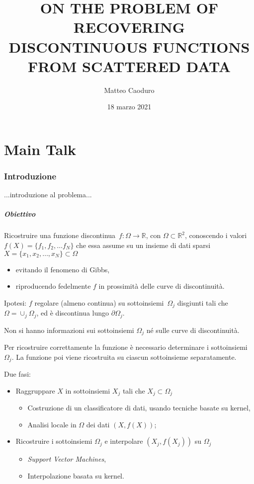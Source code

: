 \documentclass[10pt]{beamer}
\title{ON THE PROBLEM OF RECOVERING\\
	  DISCONTINUOUS FUNCTIONS\\
	  FROM SCATTERED DATA}
\author{Matteo Caoduro}
\date{18 marzo 2021}
\institute{\normalsize \emph{Relatore:} Prof.ssa\, Milvia Francesca Rossini}
\theoremstyle{definition}
\theoremstyle{plain}
\def\R{\mathbb R}
\begin{document}
\begin{frame}
  \titlepage
\end{frame}



\part<presentation>{Main Talk}

\section{Introduzione}


\begin{frame}
...introduzione al problema...
\end{frame}


\begin{frame}
\frametitle{Obiettivo}
Ricostruire  una \alert{funzione discontinua}~$f:\Omega\to\R$, con $\Omega\subset\R^2$, conoscendo i valori $f(X) = \{f_1,f_2,\dots f_N\}$ che essa assume su un insieme di \alert{dati sparsi} $X=\{x_1,x_2,\dots,x_N\}\subset\Omega$

\begin{itemize}
\item evitando il fenomeno di Gibbs,
\item riproducendo fedelmente $f$ in prossimità delle curve di discontinuità.
\end{itemize}

\bigskip
\alert{Ipotesi}: $f$ regolare (almeno continua) su sottoinsiemi~$\Omega_j$ disgiunti tali che $\Omega = \cup_j \Omega_j$, ed è discontinua lungo $\partial \Omega_j$.

\medskip
Non si hanno informazioni sui sottoinsiemi $\Omega_j$ né sulle curve di discontinuità.



\end{frame}

\begin{frame}
Per ricostruire correttamente la funzione è necessario determinare i sottoinsiemi~$\Omega_j$.
La funzione poi viene ricostruita su ciascun sottoinsieme separatamente.

\medskip
Due fasi:
\begin{itemize}
\item Raggruppare  $X$ in sottoinsiemi $X_j$ tali che $X_j\subset \Omega_j$
	\begin{itemize}
	\item Costruzione di un \alert{classificatore} di dati, usando tecniche basate su kernel,
	\item Analisi locale in $\Omega$ dei dati $(X,f(X))$;
	\end{itemize}
\item Ricostruire i sottoinsiemi $\Omega_j$ e interpolare $(X_j, f(X_j))$ su $\Omega_j$
	\begin{itemize}
	\item {\em Support Vector Machines},
	\item Interpolazione basata su kernel.
	\end{itemize}
\end{itemize}
\end{frame}
\end{document}
